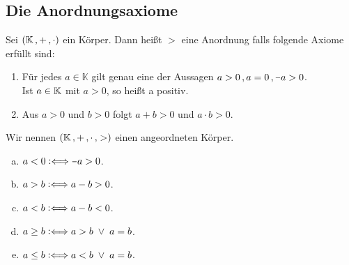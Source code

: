 \documentclass[../ana1.tex]{subfiles}
\begin{document}
\subsection{Die Anordnungsaxiome}
\setcounter{satz}{-1} %

\begin{defi}
	Sei \((\mathbb{K} \operatorname{,} + \operatorname{,} \cdot)\) ein Körper.
	Dann heißt \(>\) eine Anordnung falls folgende Axiome erfüllt sind:
	\begin{enumerate}[label=(A\arabic*)]
		\item\label{ax:A1}Für jedes \(a\in\mathbb{K}\) gilt genau eine der Aussagen \(a > 0 \ko a = 0 \ko \minus a > 0\).\\
		      Ist \(a \in \mathbb{K}\) mit \(a > 0\), so heißt a positiv.
		\item\label{ax:A2}Aus \(a>0\) und \(b>0\) folgt \(a + b > 0\) und \(a \cdot b > 0\).
	\end{enumerate}
	Wir nennen \((\mathbb{K} \operatorname{,} + \operatorname{,} \cdot \operatorname{,} >)\) einen angeordneten Körper.
\end{defi}

\begin{notation}\leavevmode
	\begin{enumerate}[(a)]
		\item \(a < 0 \longeq \minus a > 0\).
		\item \(a > b \mathrel{\vcentcolon\Longleftrightarrow} a - b > 0\). \qquad \qquad \quad {}
		\item \(a < b \mathrel{\vcentcolon\Longleftrightarrow} a - b < 0\).
		\item \(a \geq b \mathrel{\vcentcolon\Longleftrightarrow} a > b \; \vee \;  a = b\).
		\item \(a \leq b \mathrel{\vcentcolon\Longleftrightarrow} a < b \; \vee \;  a = b\).
	\end{enumerate}
\end{notation}
\end{document}
